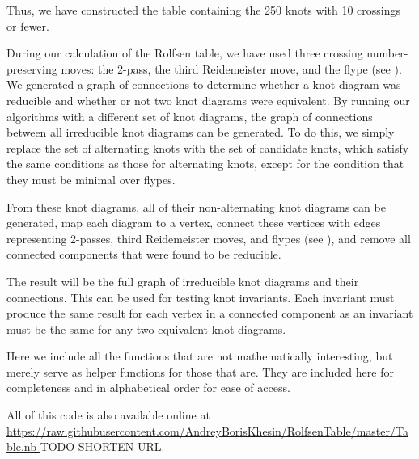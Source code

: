 \begin{paper}

Thus, we have constructed the table containing the 250 knots with 10 crossings
or fewer.



During our calculation of the Rolfsen table, we have used three crossing
number-preserving moves: the 2-pass, the third Reidemeister move, and the flype
(see \figMoves).
We generated a graph of connections to determine whether a knot diagram was
reducible and whether or not two knot diagrams were equivalent.
By running our algorithms with a different set of knot diagrams, the graph of
connections between all irreducible knot diagrams can be generated.
To do this, we simply replace the set of alternating knots with the set of
candidate knots, which satisfy the same conditions as those for alternating
knots, except for the condition that they must be minimal over flypes.

From these knot diagrams, all of their non-alternating knot diagrams can be
generated, map each diagram to a vertex, connect these vertices with edges
representing 2-passes, third Reidemeister moves, and flypes (see \figMoves), and
remove all connected components that were found to be reducible.


The result will be the full graph of irreducible knot diagrams and their
connections.
This can be used for testing knot invariants.
Each invariant must produce the same result for each vertex in a connected
component as an invariant must be the same for any two equivalent knot diagrams.


Here we include all the functions that are not mathematically interesting, but
merely serve as helper functions for those that are.
They are included here for completeness and in alphabetical order for ease of
access.

All of this code is also available online at \url{
https://raw.githubusercontent.com/AndreyBorisKhesin/RolfsenTable/master/Table.nb
} TODO SHORTEN URL.








\end{paper}

